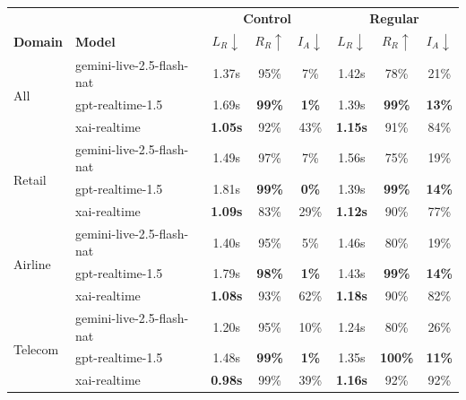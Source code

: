 \begin{tabular}{@{}ll|ccc|ccc@{}}
\toprule
 & & \multicolumn{3}{c|}{\textbf{Control}} & \multicolumn{3}{c}{\textbf{Regular}} \\
\textbf{Domain} & \textbf{Model} & $L_R\downarrow$ & $R_R\uparrow$ & $I_A\downarrow$ & $L_R\downarrow$ & $R_R\uparrow$ & $I_A\downarrow$ \\
\midrule
\multirow{3}{*}{All} & gemini-live-2.5-flash-nat & 1.37s & 95\% & 7\% & 1.42s & 78\% & 21\% \\
 & gpt-realtime-1.5 & 1.69s & \textbf{99\%} & \textbf{1\%} & 1.39s & \textbf{99\%} & \textbf{13\%} \\
 & xai-realtime & \textbf{1.05s} & 92\% & 43\% & \textbf{1.15s} & 91\% & 84\% \\
\midrule
\multirow{3}{*}{Retail} & gemini-live-2.5-flash-nat & 1.49s & 97\% & 7\% & 1.56s & 75\% & 19\% \\
 & gpt-realtime-1.5 & 1.81s & \textbf{99\%} & \textbf{0\%} & 1.39s & \textbf{99\%} & \textbf{14\%} \\
 & xai-realtime & \textbf{1.09s} & 83\% & 29\% & \textbf{1.12s} & 90\% & 77\% \\
\midrule
\multirow{3}{*}{Airline} & gemini-live-2.5-flash-nat & 1.40s & 95\% & 5\% & 1.46s & 80\% & 19\% \\
 & gpt-realtime-1.5 & 1.79s & \textbf{98\%} & \textbf{1\%} & 1.43s & \textbf{99\%} & \textbf{14\%} \\
 & xai-realtime & \textbf{1.08s} & 93\% & 62\% & \textbf{1.18s} & 90\% & 82\% \\
\midrule
\multirow{3}{*}{Telecom} & gemini-live-2.5-flash-nat & 1.20s & 95\% & 10\% & 1.24s & 80\% & 26\% \\
 & gpt-realtime-1.5 & 1.48s & \textbf{99\%} & \textbf{1\%} & 1.35s & \textbf{100\%} & \textbf{11\%} \\
 & xai-realtime & \textbf{0.98s} & 99\% & 39\% & \textbf{1.16s} & 92\% & 92\% \\
\bottomrule
\end{tabular}